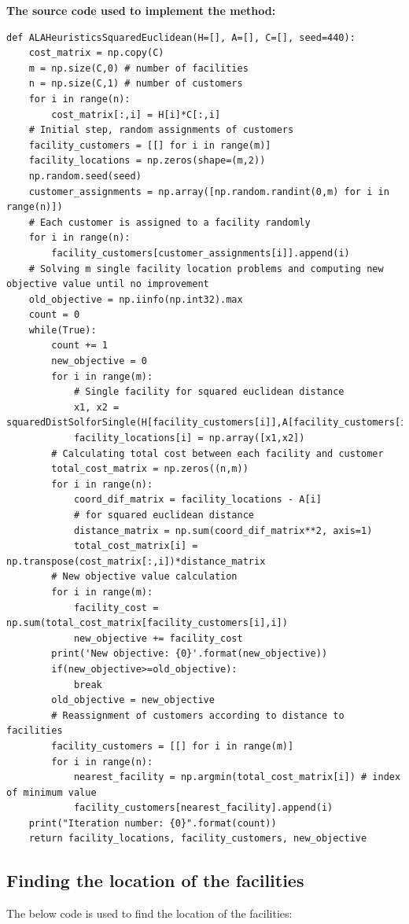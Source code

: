 \documentclass[12pt]{article}
\begin{document}
\textbf{The source code used to implement the method:}
\begin{lstlisting}[style=pythonstyle]
def ALAHeuristicsSquaredEuclidean(H=[], A=[], C=[], seed=440): 
    cost_matrix = np.copy(C)
    m = np.size(C,0) # number of facilities
    n = np.size(C,1) # number of customers
    for i in range(n):
        cost_matrix[:,i] = H[i]*C[:,i]
    # Initial step, random assignments of customers
    facility_customers = [[] for i in range(m)]
    facility_locations = np.zeros(shape=(m,2))
    np.random.seed(seed)
    customer_assignments = np.array([np.random.randint(0,m) for i in range(n)])
    # Each customer is assigned to a facility randomly
    for i in range(n):
        facility_customers[customer_assignments[i]].append(i)
    # Solving m single facility location problems and computing new objective value until no improvement
    old_objective = np.iinfo(np.int32).max
    count = 0
    while(True):
        count += 1
        new_objective = 0
        for i in range(m):
            # Single facility for squared euclidean distance
            x1, x2 = squaredDistSolforSingle(H[facility_customers[i]],A[facility_customers[i]],C[:,facility_customers[i]],i)
            facility_locations[i] = np.array([x1,x2])
        # Calculating total cost between each facility and customer
        total_cost_matrix = np.zeros((n,m))
        for i in range(n):
            coord_dif_matrix = facility_locations - A[i]
            # for squared euclidean distance
            distance_matrix = np.sum(coord_dif_matrix**2, axis=1)
            total_cost_matrix[i] = np.transpose(cost_matrix[:,i])*distance_matrix
        # New objective value calculation
        for i in range(m):
            facility_cost = np.sum(total_cost_matrix[facility_customers[i],i])
            new_objective += facility_cost
        print('New objective: {0}'.format(new_objective))    
        if(new_objective>=old_objective):
            break
        old_objective = new_objective
        # Reassignment of customers according to distance to facilities
        facility_customers = [[] for i in range(m)]
        for i in range(n):
            nearest_facility = np.argmin(total_cost_matrix[i]) # index of minimum value
            facility_customers[nearest_facility].append(i)   
    print("Iteration number: {0}".format(count))    
    return facility_locations, facility_customers, new_objective
\end{lstlisting}

\subsection{Finding the location of the facilities}
The below code is used to find the location of the facilities:
\end{document}
